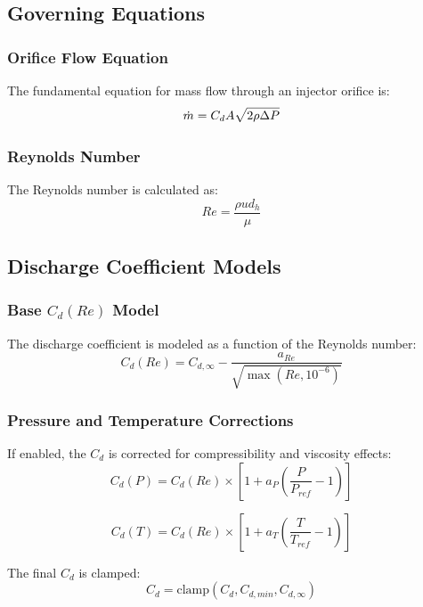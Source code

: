 \subsection{Governing Equations}

\subsubsection{Orifice Flow Equation}
The fundamental equation for mass flow through an injector orifice is:
\begin{equation}
\dot{m} = C_d A \sqrt{2 \rho \Delta P}
\end{equation}

\subsubsection{Reynolds Number}
The Reynolds number is calculated as:
\begin{equation}
Re = \frac{\rho u d_h}{\mu}
\end{equation}

\subsection{Discharge Coefficient Models}

\subsubsection{Base \(C_d(Re)\) Model}
The discharge coefficient is modeled as a function of the Reynolds number:
\begin{equation}
C_d(Re) = C_{d,\infty} - \frac{a_{Re}}{\sqrt{\max(Re, 10^{-6})}}
\end{equation}

\subsubsection{Pressure and Temperature Corrections}
If enabled, the \(C_d\) is corrected for compressibility and viscosity effects:
\begin{equation}
C_d(P) = C_d(Re) \times \left[1 + a_P \left(\frac{P}{P_{ref}} - 1\right)\right]
\end{equation}

\begin{equation}
C_d(T) = C_d(Re) \times \left[1 + a_T \left(\frac{T}{T_{ref}} - 1\right)\right]
\end{equation}

The final \(C_d\) is clamped:
\begin{equation}
C_d = \text{clamp}(C_d, C_{d,min}, C_{d,\infty})
\end{equation}

